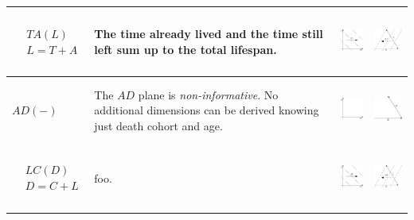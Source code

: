 \documentclass[
  12pt
]{scrartcl}
\begin{document}
\begin{center}
\begin{longtable}{m{}m{}m{}m{}}
  \midrule
  $$\begin{aligned}
    &TA(L) \\
    &L = T + A
  \end{aligned}$$ &
  The time already lived and the time still left sum up to the total lifespan. &
  \includegraphics[height = 2cm]{../fig/TAl.pdf} &
  \includegraphics[height = 2cm]{../fig/TAl_iso.pdf}  \\
  \midrule
  $AD(-)$ &
  The $AD$ plane is \emph{non-informative}. No additional dimensions can be derived knowing just death cohort and age. &
  \includegraphics[height = 2cm]{../fig/AD.pdf} &
  \includegraphics[height = 2cm]{../fig/AD_iso.pdf}  \\
  \midrule
  $$\begin{aligned}
    &LC(D) \\
    &D = C + L
  \end{aligned}$$ &
  foo. &
  \includegraphics[height = 2cm]{../fig/LCd.pdf} &
  \includegraphics[height = 2cm]{../fig/LCd_iso.pdf}  \\

\end{longtable}
\end{center}
\end{document}
